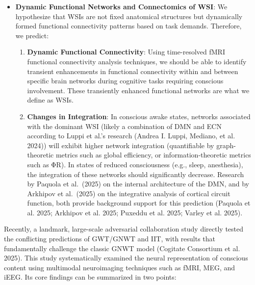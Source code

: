 \documentclass[
  a4paper]{article}
\providecommand{\tightlist}{%
  \setlength{\itemsep}{0pt}\setlength{\parskip}{0pt}}
\begin{document}
\begin{itemize}
\item
  \textbf{Dynamic Functional Networks and Connectomics of WSI}: We
  hypothesize that WSIs are not fixed anatomical structures but
  dynamically formed functional connectivity patterns based on task
  demands. Therefore, we predict:

  \begin{enumerate}
  \def\labelenumi{\arabic{enumi}.}
  \tightlist
  \item
    \textbf{Dynamic Functional Connectivity}: Using time-resolved fMRI
    functional connectivity analysis techniques, we should be able to
    identify transient enhancements in functional connectivity within
    and between specific brain networks during cognitive tasks requiring
    conscious involvement. These transiently enhanced functional
    networks are what we define as WSIs.
  \item
    \textbf{Changes in Integration}: In conscious awake states, networks
    associated with the dominant WSI (likely a combination of DMN and
    ECN according to Luppi et al.'s research (Andrea I. Luppi, Mediano,
    et al. 2024)) will exhibit higher network integration (quantifiable
    by graph-theoretic metrics such as global efficiency, or
    information-theoretic metrics such as ΦR). In states of reduced
    consciousness (e.g., sleep, anesthesia), the integration of these
    networks should significantly decrease. Research by Paquola et
    al.~(2025) on the internal architecture of the DMN, and by Arkhipov
    et al.~(2025) on the integrative analysis of cortical circuit
    function, both provide background support for this prediction
    (Paquola et al. 2025; Arkhipov et al. 2025; Puxeddu et al. 2025;
    Varley et al. 2025).
  \end{enumerate}
\end{itemize}

Recently, a landmark, large-scale adversarial collaboration study
directly tested the conflicting predictions of GWT/GNWT and IIT, with
results that fundamentally challenge the classic GNWT model (Cogitate
Consortium et al. 2025). This study systematically examined the neural
representation of conscious content using multimodal neuroimaging
techniques such as fMRI, MEG, and iEEG. Its core findings can be
summarized in two points:
\end{document}
